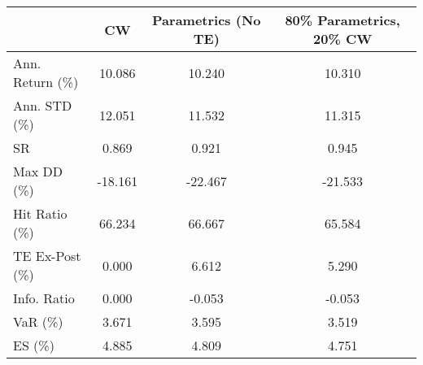 \begin{tabular}{lccc}
\toprule
{} &      CW &  Parametrics (No TE) &  80\% Parametrics, 20\% CW \\
\midrule
Ann. Return (\%) &  10.086 &               10.240 &                   10.310 \\
Ann. STD (\%)    &  12.051 &               11.532 &                   11.315 \\
SR              &   0.869 &                0.921 &                    0.945 \\
Max DD (\%)      & -18.161 &              -22.467 &                  -21.533 \\
Hit Ratio (\%)   &  66.234 &               66.667 &                   65.584 \\
TE Ex-Post (\%)  &   0.000 &                6.612 &                    5.290 \\
Info. Ratio     &   0.000 &               -0.053 &                   -0.053 \\
VaR (\%)         &   3.671 &                3.595 &                    3.519 \\
ES (\%)          &   4.885 &                4.809 &                    4.751 \\
\bottomrule
\end{tabular}
